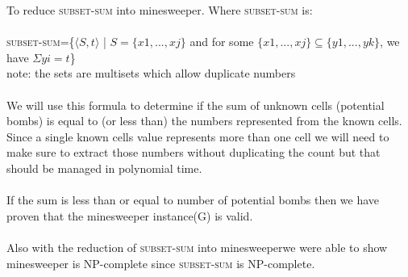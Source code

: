 \documentclass{article}
\begin{document}
\begin{empfile}
To reduce \textsc{subset-sum} into minesweeper. Where \textsc{subset-sum} is: \\ \ \\

\textsc{subset-sum}=\{$\langle S, t \rangle$ | $S=\{x1,...,xj\}$ and for some 
$\{x1,...,xj\} \subseteq \{y1,...,yk\}$, we have $\Sigma yi=t$\} \\
note: the sets are multisets which allow duplicate numbers \\ \ \\

We will use this formula to determine if the sum of unknown cells
(potential bombs) is equal to (or less than) the numbers represented
from the known cells. Since a single known cells value represents more 
than one cell we will need to make sure to extract those numbers
without duplicating the count but that should be managed in polynomial 
time. \\ \ \\

If the sum is less than or equal to number of potential bombs then
we have proven that the minesweeper instance(G) is valid. \\ \ \\

Also with the reduction of \textsc{subset-sum} into minesweeperwe were 
able to show minesweeper is NP-complete since \textsc{subset-sum}
is NP-complete.








\end{empfile}
\immediate{}
\end{document}

